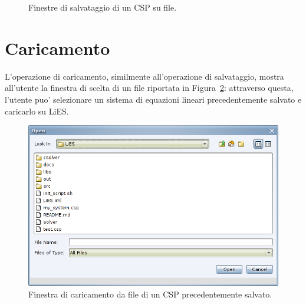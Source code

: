 \documentclass{article}
\begin{document}
\begin{figure}[htp!]
\centering
	\caption{Finestre di salvataggio di un CSP su file.}
	\label{fig:salvataggio}
\end{figure}


\section{Caricamento}
\label{sec:caricamento}

L'operazione di caricamento, similmente all'operazione di salvataggio, mostra all'utente la finestra di scelta di un file riportata in Figura~\ref{fig:caricamento}: attraverso questa, l'utente puo' selezionare un sistema di equazioni lineari precedentemente salvato e caricarlo su LiES. 

\begin{figure}[htp!]
	\centering
	\includegraphics[scale=.5]{ug-images/load-dialog.png}
	\caption{Finestra di caricamento da file di un CSP precedentemente salvato.}
	\label{fig:caricamento}
\end{figure}
\end{document}
